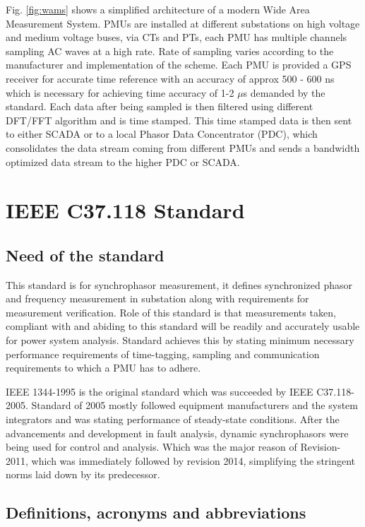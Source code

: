 Fig. \ref{fig:wams} shows a simplified architecture of a modern Wide Area Measurement System. PMUs are installed at different substations on high voltage and medium voltage buses, via CTs and PTs, each PMU has multiple channels sampling AC waves at a high rate. Rate of sampling varies according to the manufacturer and implementation of the scheme. Each PMU is provided a GPS receiver for accurate time reference with an accuracy of approx 500 - 600 ns which is necessary for achieving time accuracy of 1-2 $\mu$s demanded by the standard. Each data after being sampled is then filtered using different DFT/FFT algorithm and is time stamped. This time stamped data is then sent to either SCADA or to a local Phasor Data Concentrator (PDC), which consolidates the data stream coming from different PMUs and sends a bandwidth optimized data stream to the higher PDC or SCADA. 

\section{IEEE C37.118 Standard}

\subsection{Need of the standard}
This standard is for synchrophasor measurement, it defines synchronized phasor and frequency measurement in substation along with requirements for measurement verification. Role of this standard is that measurements taken, compliant with and abiding to this standard will be readily and accurately usable for power system analysis. Standard achieves this by stating minimum necessary performance requirements of time-tagging, sampling and communication requirements to which a PMU has to adhere.

IEEE 1344-1995 is the original standard which was succeeded by IEEE C37.118-2005. Standard of 2005 mostly followed equipment manufacturers and the system integrators and was stating performance of steady-state conditions. After the advancements and development in fault analysis, dynamic synchrophasors were being used for control and analysis. Which was the major reason of Revision-2011, which was immediately followed by revision 2014, simplifying the stringent norms laid down by its predecessor.

\subsection{Definitions, acronyms and abbreviations}

